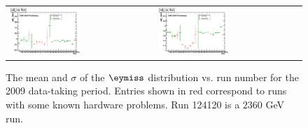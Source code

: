 \begin{figure}[h!]
  \centering
  \begin{tabular}{ll}
    \includegraphics[width=0.5\textwidth]{plots_METStability/h_calometPyMean_vs_run.eps} &
    \includegraphics[width=0.5\textwidth]{plots_METStability/h_calometPySigma_vs_run.eps} \\
  \end{tabular}
  \caption{\small The mean and $\sigma$ of the $\eymiss$ distribution
    vs. run number for the 2009 data-taking period.  Entries shown in
    red correspond to runs with some known hardware problems. Run 124120 is a $2360$ GeV run.\label{fig:MEy_vs_run}}
\end{figure}


\clearpage

